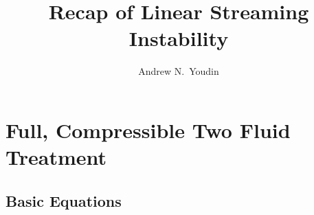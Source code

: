 \documentclass[12pt, preprint,numberedappendix]{emulateapj}
\begin{document}



\title{Recap of Linear Streaming Instability}
\author{Andrew N.\ Youdin}


\section{Full, Compressible Two Fluid Treatment}
\subsection{Basic Equations}
\end{document}
